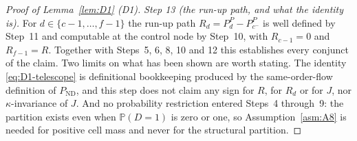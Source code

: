 \documentclass[11pt]{article}
\newcommand{\Prb}{\mathbb{P}}
\newcommand{\ND}{\mathrm{ND}}
\begin{document}
\begin{proof}[Proof of Lemma~\ref{lem:D1} (D1)]
\emph{Step 13 (the run-up path, and what the identity is).} For $d \in \{c-1,\dots,f-1\}$ the run-up
path $R_d = P_d^P - P_{c^-}^P$ is well defined by Step~11 and computable at the control node by
Step~10, with $R_{c-1} = 0$ and $R_{f-1} = R$. Together with Steps~5, 6, 8, 10 and 12 this
establishes every conjunct of the claim. Two limits on what has been shown are worth stating. The
identity \eqref{eq:D1-telescope} is definitional bookkeeping produced by the same-order-flow
definition of $P_{\ND}$, and this step does not claim any sign for $R$, for $R_d$ or for $J$, nor
$\kappa$-invariance of $J$. And no probability restriction entered Steps~4 through~9: the partition
exists even when $\Prb(D=1)$ is zero or one, so Assumption~\ref{asm:A8} is needed for positive cell
mass and never for the structural partition.
\end{proof}
\end{document}

